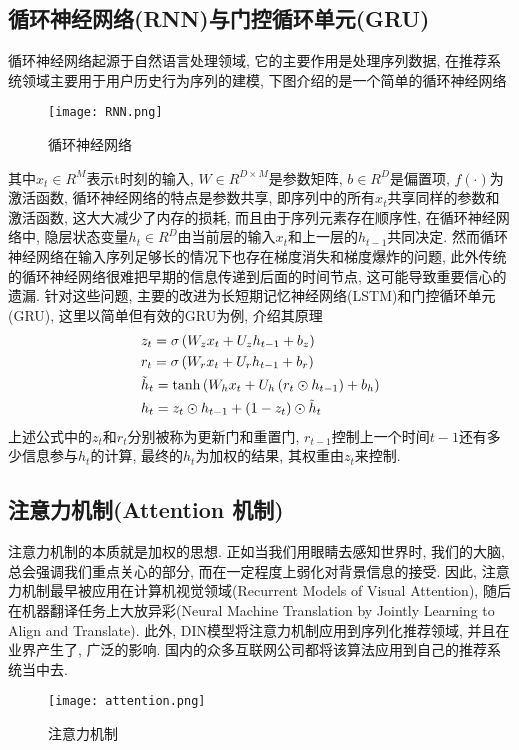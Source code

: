 \subsection{循环神经网络(RNN)与门控循环单元(GRU)}
循环神经网络起源于自然语言处理领域, 它的主要作用是处理序列数据, 在推荐系统领域主要用于用户历史行为序列的建模, 下图介绍的是一个简单的循环神经网络
\begin{figure}[htbp]
	\centering
	\texttt{[image: RNN.png]}
	\caption{循环神经网络}
	\label{FIGhtmltext}
\end{figure}
其中$x_t \in R^{M}$表示t时刻的输入, $W \in R^{D\times M}$是参数矩阵, $b \in R^D$是偏置项, $f(\cdot)$为激活函数, 循环神经网络的特点是参数共享, 即序列中的所有$x_t$共享同样的参数和激活函数, 这大大减少了内存的损耗, 而且由于序列元素存在顺序性, 在循环神经网络中, 隐层状态变量$h_t \in R^D$由当前层的输入$x_t$和上一层的$h_{t-1}$共同决定. 然而循环神经网络在输入序列足够长的情况下也存在梯度消失和梯度爆炸的问题, 此外传统的循环神经网络很难把早期的信息传递到后面的时间节点, 这可能导致重要信心的遗漏. 针对这些问题, 主要的改进为长短期记忆神经网络(LSTM)和门控循环单元(GRU), 这里以简单但有效的GRU为例, 介绍其原理
\begin{equation}
	\begin{gathered}
		z_{t}=\sigma\left(W_{z} x_{t}+U_{z} h_{t-1}+b_{z}\right) \hfill \\
		r_{t}=\sigma\left(W_{r} x_{t}+U_{r} h_{t-1}+b_{r}\right) \hfill \\
		\tilde{h}_{t}=\tanh \left(W_{h} x_{t}+U_{h}\left(r_{t} \odot h_{t-1}\right)+b_{h}\right) \hfill \\
		h_{t}=z_{t} \odot h_{t-1}+\left(1-z_{t}\right) \odot \tilde{h}_{t}\hfill \\
	\end{gathered}
\end{equation}
上述公式中的$z_t$和$r_t$分别被称为更新门和重置门, $r_{t-1}$控制上一个时间$t-1$还有多少信息参与$h_t$的计算, 最终的$h_t$为加权的结果, 其权重由$z_t$来控制.
\subsection{注意力机制(Attention 机制)}
注意力机制的本质就是加权的思想. 正如当我们用眼睛去感知世界时, 我们的大脑, 总会强调我们重点关心的部分, 而在一定程度上弱化对背景信息的接受. 因此, 注意力机制最早被应用在计算机视觉领域(Recurrent Models of Visual Attention), 随后在机器翻译任务上大放异彩(Neural Machine Translation by Jointly Learning to Align and Translate). 此外, DIN模型将注意力机制应用到序列化推荐领域, 并且在业界产生了, 广泛的影响. 国内的众多互联网公司都将该算法应用到自己的推荐系统当中去. 
\begin{figure}[htbp]
	\centering
	\texttt{[image: attention.png]}
	\caption{注意力机制}
	\label{FIGhtmltext}
\end{figure}

